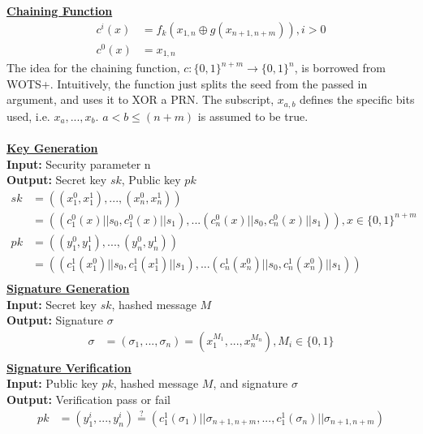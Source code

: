 \documentclass[]{scrartcl}
\makeatletter
\newcommand{\mathcenter}{\@fleqnfalse}
\makeatother
\begin{document}
\textbf{\underline{Chaining Function}}
\begin{equation}
\begin{split}
c^{i}(x) & = f_{k}(x_{1,n} \oplus g(x_{n+1,n+m})), i > 0 \\
c^0(x) & = x_{1,n}
\end{split}
\end{equation}
The idea for the chaining function, $c : \{0,1\}^{n+m} \rightarrow \{0,1\}^{n}$, is borrowed from WOTS+. Intuitively, the function just splits the seed from the passed in argument, and uses it to XOR a PRN. The subscript, $x_{a,b}$ defines the specific bits used, i.e. $x_a,...,x_b$. $a < b \leq (n+m)$ is assumed to be true.\\ \\
\textbf{\underline{Key Generation}}\\
\textbf{Input:} Security parameter n \\
\textbf{Output:} Secret key $sk$, Public key $pk$
\mathcenter
\begin{equation}
\begin{split}
sk & = ((x_{1}^0, x_{1}^{1}),...,(x_{n}^0, x_{n}^{1}))\\
& = ((c^0_1(x)||s_0,c^0_1(x)||s_1),...(c^0_n(x)||s_0,c^0_n(x)||s_1)), x \in \{0,1\}^{n+m}\\
pk & = ((y_{1}^0, y_{1}^{1}),...,(y_{n}^0, y_{n}^{1})) \\ 
& = ((c^1_1(x_{1}^0)||s_0,c^1_1(x_{1}^1)||s_1),...(c^1_n(x_{n}^0)||s_0,c^1_n(x_{n}^0)||s_1))\\
\end{split}
\end{equation}
\textbf{\underline{Signature Generation}}\\
\textbf{Input:} Secret key $sk$, hashed message $M$ \\
\textbf{Output:} Signature $\sigma$
\mathcenter
\begin{equation}
\begin{split}
\sigma & = (\sigma_1,...,\sigma_n)= (x^{M_1}_1, ..., x^{M_n}_n), M_i \in \{0,1\} \\
\end{split}
\end{equation}
\textbf{\underline{Signature Verification}}\\
\textbf{Input:} Public key $pk$, hashed message $M$, and signature $\sigma$\\
\textbf{Output:} Verification pass or fail
\mathcenter
\begin{equation}
\begin{split}
pk & = (y^i_1,...,y^i_n) \stackrel{?}{=}(c^1_1(\sigma_{1})||\sigma_{n+1,n+m},...,c^1_1(\sigma_{n})||\sigma_{n+1,n+m})
\end{split}
\end{equation}
\end{document}
